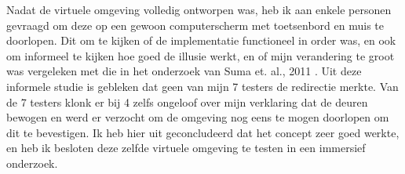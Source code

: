 Nadat de virtuele omgeving volledig ontworpen was, heb ik aan enkele personen
gevraagd om deze op een gewoon computerscherm met toetsenbord en muis te
doorlopen. Dit om te kijken of de implementatie functioneel in order was, en
ook om informeel te kijken hoe goed de illusie werkt, en of mijn verandering te 
groot was vergeleken met die in het onderzoek van Suma et. al., 2011 
\cite{suma11}. Uit deze informele studie is gebleken dat geen van mijn 7 testers 
de redirectie merkte. Van de 7 testers klonk er bij 4 zelfs ongeloof over mijn 
verklaring dat de deuren bewogen en werd er verzocht om de omgeving nog eens te 
mogen doorlopen om dit te bevestigen. Ik heb hier uit geconcludeerd dat het 
concept zeer goed werkte, en heb ik besloten deze zelfde virtuele omgeving te 
testen in een immersief onderzoek.